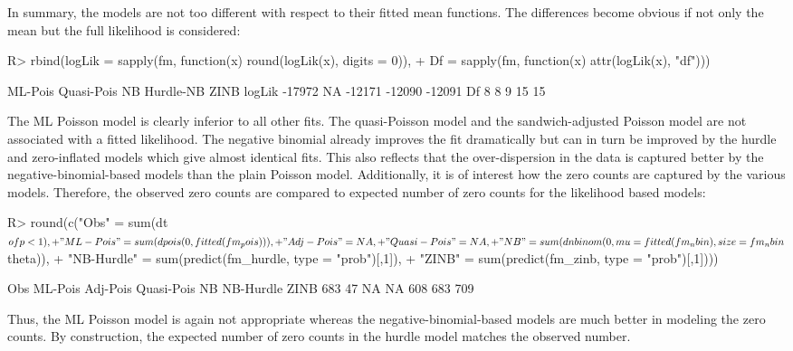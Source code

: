 \documentclass{Z}
\begin{document}
In summary, the models are not too different with respect to their fitted 
mean functions. The differences become obvious if not only the mean but the
full likelihood is considered:
\begin{Schunk}
\begin{Sinput}
R> rbind(logLik = sapply(fm, function(x) round(logLik(x), digits = 0)),
+   Df = sapply(fm, function(x) attr(logLik(x), "df")))
\end{Sinput}
\begin{Soutput}
       ML-Pois Quasi-Pois     NB Hurdle-NB   ZINB
logLik  -17972         NA -12171    -12090 -12091
Df           8          8      9        15     15
\end{Soutput}
\end{Schunk}
The ML Poisson model is clearly inferior to all other fits. The quasi-Poisson
model and the sandwich-adjusted Poisson model are not associated with a fitted
likelihood. The negative binomial already improves the fit dramatically but
can in turn be improved by the hurdle and zero-inflated models which give
almost identical fits. This also reflects that the over-dispersion in the data
is captured better by the negative-binomial-based models than the plain
Poisson model. Additionally, it is of interest how the zero counts
are captured by the various models. Therefore, the observed zero counts are
compared to expected number of zero counts for the likelihood based models:
\begin{Schunk}
\begin{Sinput}
R> round(c("Obs" = sum(dt$ofp < 1),
+   "ML-Pois" = sum(dpois(0, fitted(fm_pois))),
+   "Adj-Pois" = NA,
+   "Quasi-Pois" = NA,
+   "NB" = sum(dnbinom(0, mu = fitted(fm_nbin), size = fm_nbin$theta)),
+   "NB-Hurdle" = sum(predict(fm_hurdle, type = "prob")[,1]),
+   "ZINB" = sum(predict(fm_zinb, type = "prob")[,1])))
\end{Sinput}
\begin{Soutput}
       Obs    ML-Pois   Adj-Pois Quasi-Pois         NB  NB-Hurdle       ZINB 
       683         47         NA         NA        608        683        709 
\end{Soutput}
\end{Schunk}
Thus, the ML Poisson model is again not appropriate whereas the negative-binomial-based
models are much better in modeling the zero counts. By construction, the
expected number of zero counts in the hurdle model matches the observed
number.
\end{document}
